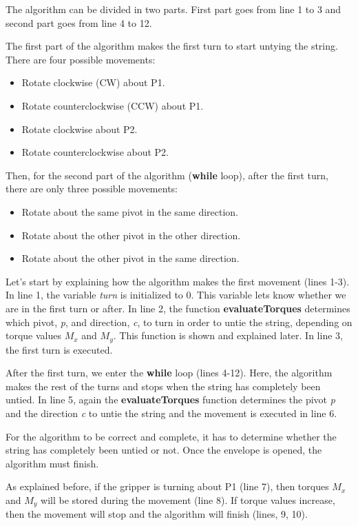The algorithm can be divided in two parts. First part goes from line 1 to 3 and second part goes from line 4 to 12. 

The first part of the algorithm makes the first turn to start untying the string. There are four possible movements:
\begin{itemize}
	\item Rotate clockwise (CW) about P1.
	\item Rotate counterclockwise (CCW) about P1.
	\item Rotate clockwise about P2.
	\item Rotate counterclockwise about P2.
\end{itemize}

Then, for the second part of the algorithm (\textbf{while} loop), after the first turn, there are only three possible movements:
\begin{itemize}
	\item Rotate about the same pivot in the same direction.
	\item Rotate about the other pivot in the other direction.
	\item Rotate about the other pivot in the same direction.
\end{itemize}

Let's start by explaining how the algorithm makes the first movement (lines 1-3).
In line 1, the variable \textit{turn} is initialized to 0. This variable lets know whether we are in the first turn or after.
In line 2, the function \textbf{evaluateTorques} determines which pivot, \textit{p}, and direction, \textit{c}, to turn in order to untie the string, depending on torque values $M_{x}$ and $M_{y}$. This function is shown and explained later. In line 3, the first turn is executed.

After the first turn, we enter the \textbf{while} loop (lines 4-12). Here, the algorithm makes the rest of the turns and stops when the string has completely been untied. In line 5, again the \textbf{evaluateTorques} function determines the pivot \textit{p} and the direction \textit{c} to untie the string and the movement is executed in line 6. 

For the algorithm to be correct and complete, it has to determine whether the string has completely been untied or not. Once the envelope is opened, the algorithm must finish. 

As explained before, if the gripper is turning about P1 (line 7), then torques $M_{x}$ and $M_{y}$ will be stored during the movement (line 8). If torque values increase, then the movement will stop and the algorithm will finish (lines, 9, 10). 

